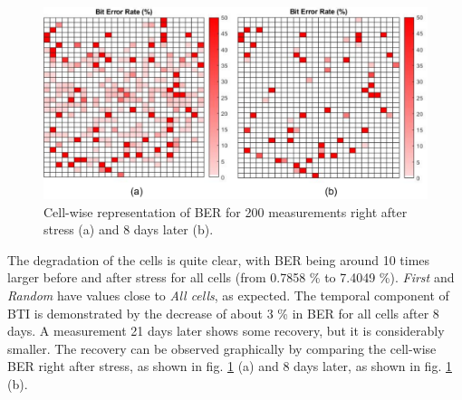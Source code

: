 \begin{table}[H]
  \caption{Mean BER value for the different selections when performing 200 power-ups at different points in time after accelerated aging.}
  \label{tab:aging_sel}%
\end{table}%

 \vspace*{-\baselineskip}


\begin{figure}[b!]
    \centering
    \includegraphics[width=14cm]{images/BER aging comparison.pdf}
    \caption{Cell-wise representation of BER for 200 measurements right after stress (a) and 8 days later (b). }
    \label{fig:BER_aging_comparison}
\end{figure}

The degradation of the cells is quite clear, with BER being around 10 times larger before and after stress for all cells (from 0.7858 \% to 7.4049 \%). \textit{First} and \textit{Random} have values close to \textit{All cells}, as expected. The temporal component of BTI is demonstrated by the decrease of about 3 \% in BER for all cells after 8 days. A measurement 21 days later shows some recovery, but it is considerably smaller. The recovery can be observed graphically by comparing the cell-wise BER right after stress, as shown in fig. \ref{fig:BER_aging_comparison} (a) and 8 days later, as shown in fig. \ref{fig:BER_aging_comparison} (b).  

